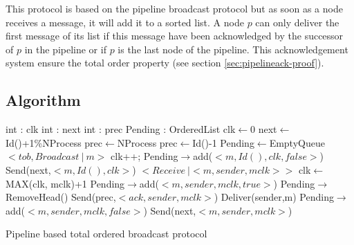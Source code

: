 \documentclass[a4paper]{article}
\begin{document}
This protocol is based on the pipeline broadcast protocol but as soon as a node
receives a message, it will add it to a sorted list. A node $p$ can only deliver the
first message of its list if this message have been acknowledged by the
successor of $p$ in the pipeline or if $p$ is the last node of the pipeline.
This acknowledgement system ensure the total order property (see section
\ref{sec:pipelineack-proof}).
\subsection{Algorithm}
\begin{algorithm}[H]
    \centering
    \begin{algorithmic}[5]
        \Data
        \State int : clk
        \State int : next
        \State int : prec
        \State Pending : OrderedList
        \EndData
        \Init
        \State clk$\gets$0
        \State next$\gets$Id()+1\%NProcess
        \State prec$\gets$NProcess
        \Else
        \State prec$\gets$Id()-1
        \EndIf
        \State Pending$\gets$EmptyQueue
        \EndInit
        \Event $< tob,Broadcast\ |\ m> $
        \State clk++;
        \State Pending$\rightarrow$add($<m,Id(), clk, false>$) 
        \State Send(next,$<m,Id(),clk>$)
        \EndEvent
        \Event $<Receive\ | <m,sender, mclk>>$
        \State clk$\gets$MAX(clk, mclk)+1
        \State Pending$\rightarrow$add($<m,sender,mclk,true>$)
        \State Pending$\rightarrow$RemoveHead()
        \State Send(prec,$<ack,sender,mclk>$)
        \State Deliver(sender,m)
        \EndIf
        \Else
        \State Pending$\rightarrow$add($<m,sender,mclk,false>$)
        \State Send(next,$<m,sender,mclk>$)
        \EndIf
        \EndEvent
    \end{algorithmic}
    \caption{Pipeline based total ordered broadcast protocol}
\end{algorithm}
\end{document}
